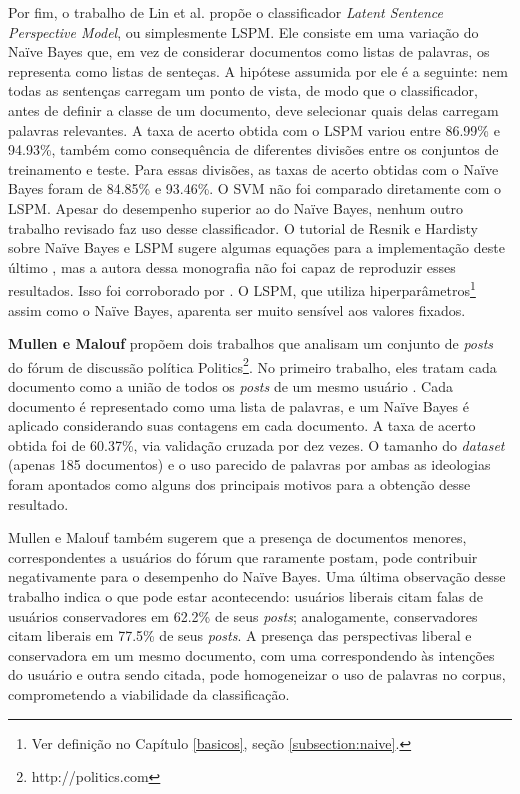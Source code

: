Por fim, o trabalho de Lin et al. propõe o classificador \emph{Latent Sentence Perspective Model}, ou simplesmente LSPM. Ele consiste em uma variação do Naïve Bayes que, em vez de considerar documentos como listas de palavras, os representa como listas de senteças. A hipótese assumida por ele é a seguinte: nem todas as sentenças carregam um ponto de vista, de modo que o classificador, antes de definir a classe de um documento, deve selecionar quais delas carregam palavras relevantes. A taxa de acerto obtida com o LSPM variou entre  86.99\% e 94.93\%, também como consequência de diferentes divisões entre os conjuntos de treinamento e teste. Para essas divisões, as taxas de acerto obtidas com o Naïve Bayes foram de 84.85\% e 93.46\%. O SVM não foi comparado diretamente com o LSPM. Apesar do desempenho superior ao do Naïve Bayes, nenhum outro trabalho revisado faz uso desse classificador. O tutorial de Resnik e Hardisty sobre Naïve Bayes e LSPM sugere algumas equações para a implementação deste último \cite{resnik}, mas a autora dessa monografia não foi capaz de reproduzir esses resultados. Isso foi corroborado por \cite{email}. O LSPM, que utiliza hiperparâmetros\footnote{Ver definição no Capítulo \ref{basicos}, seção \ref{subsection:naive}.} assim como o Naïve Bayes, aparenta ser muito sensível aos valores fixados.

\textbf{Mullen e Malouf} propõem dois trabalhos que analisam um conjunto de \emph{posts} do fórum de discussão política Politics\footnote{http://politics.com}. No primeiro trabalho, eles tratam cada documento como a união de todos os \emph{posts} de um mesmo usuário \cite{aaai-politics}. Cada documento é representado como uma lista de palavras, e um Naïve Bayes é aplicado considerando suas contagens em cada documento. A taxa de acerto obtida foi de 60.37\%, via validação cruzada por dez vezes. O tamanho do \emph{dataset} (apenas 185 documentos) e o uso parecido de palavras por ambas as ideologias foram apontados como alguns dos principais motivos para a obtenção desse resultado.

Mullen e Malouf também sugerem que a presença de documentos menores, correspondentes a usuários do fórum que raramente postam, pode contribuir negativamente para o desempenho do Naïve Bayes. Uma última observação desse trabalho indica o que pode estar acontecendo: usuários liberais citam falas de usuários conservadores em 62.2\% de seus \emph{posts}; analogamente, conservadores citam liberais em 77.5\%  de seus \emph{posts}. A presença das perspectivas liberal e conservadora em um mesmo documento, com uma correspondendo às intenções do usuário e outra sendo citada, pode homogeneizar o uso de palavras no corpus, comprometendo a viabilidade da classificação.

